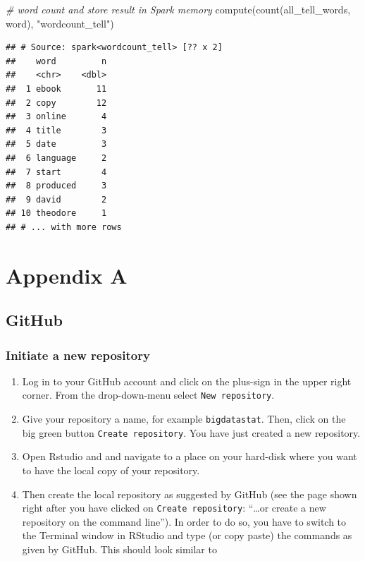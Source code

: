 \documentclass[
  12pt,
]{style/krantz}
\newenvironment{Shaded}{\begin{snugshade}}{\end{snugshade}}
\newcommand{\CommentTok}[1]{\textcolor[rgb]{0.56,0.35,0.01}{\textit{#1}}}
\newcommand{\FunctionTok}[1]{\textcolor[rgb]{0.00,0.00,0.00}{#1}}
\newcommand{\NormalTok}[1]{#1}
\newcommand{\StringTok}[1]{\textcolor[rgb]{0.31,0.60,0.02}{#1}}
\providecommand{\tightlist}{%
  \setlength{\itemsep}{0pt}\setlength{\parskip}{0pt}}
\begin{document}
\begin{Shaded}
\begin{Highlighting}[]
\CommentTok{\# word count and store result in Spark memory}
\FunctionTok{compute}\NormalTok{(}\FunctionTok{count}\NormalTok{(all\_tell\_words, word), }\StringTok{"wordcount\_tell"}\NormalTok{)}
\end{Highlighting}
\end{Shaded}

\begin{verbatim}
## # Source: spark<wordcount_tell> [?? x 2]
##    word         n
##    <chr>    <dbl>
##  1 ebook       11
##  2 copy        12
##  3 online       4
##  4 title        3
##  5 date         3
##  6 language     2
##  7 start        4
##  8 produced     3
##  9 david        2
## 10 theodore     1
## # ... with more rows
\end{verbatim}

\backmatter

\hypertarget{appendix-appendix}{%
\appendix {}}


\hypertarget{appendix-a}{%
\chapter{Appendix A}\label{appendix-a}}

\hypertarget{github}{%
\section{GitHub}\label{github}}

\hypertarget{initiate-a-new-repository}{%
\subsection{Initiate a new repository}\label{initiate-a-new-repository}}

\begin{enumerate}
\def\labelenumi{\arabic{enumi}.}
\tightlist
\item
  Log in to your GitHub account and click on the plus-sign in the upper right corner. From the drop-down-menu select \texttt{New\ repository}.
\item
  Give your repository a name, for example \texttt{bigdatastat}. Then, click on the big green button \texttt{Create\ repository}. You have just created a new repository.
\item
  Open Rstudio and and navigate to a place on your hard-disk where you want to have the local copy of your repository.
\item
  Then create the local repository as suggested by GitHub (see the page shown right after you have clicked on \texttt{Create\ repository}: ``\ldots or create a new repository on the command line''). In order to do so, you have to switch to the Terminal window in RStudio and type (or copy paste) the commands as given by GitHub. This should look similar to
\end{enumerate}
\end{document}
